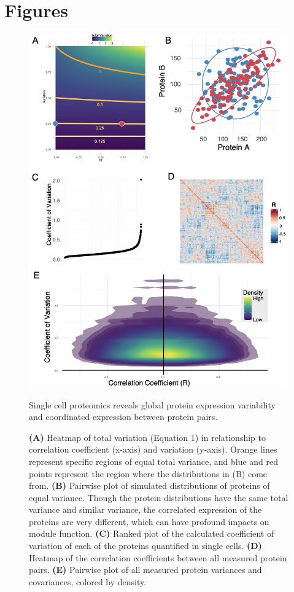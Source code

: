 \section{Figures}

\begin{figure}[hbt!]
\centering
\includegraphics[width=12cm, keepaspectratio]{figs/paper2/fig1.png}
\caption{Single cell proteomics reveals global protein expression variability and coordinated expression between protein pairs.}
\caption*{\textbf{(A)} Heatmap of total variation (Equation 1) in relationship to correlation coefficient (x-axis) and variation (y-axis). Orange lines represent specific regions of equal total variance, and blue and red points represent the region where the distributions in (B) come from. \textbf{(B)} Pairwise plot of simulated distributions of proteins of equal variance. Though the protein distributions have the same total variance and similar variance, the correlated expression of the proteins are very different, which can have profound impacts on module function. \textbf{(C)} Ranked plot of the calculated coefficient of variation of each of the proteins quantified in single cells. \textbf{(D)} Heatmap of the correlation coefficients between all measured protein pairs. \textbf{(E)} Pairwise plot of all measured protein variances and covariances, colored by density.}
\label{fig:paper2_fig1}
\end{figure}

